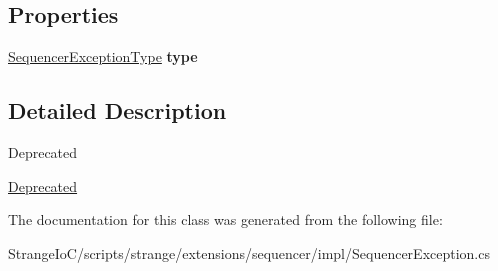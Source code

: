 \subsection*{Properties}
\begin{DoxyCompactItemize}
\item 
\hypertarget{classstrange_1_1extensions_1_1sequencer_1_1impl_1_1_sequencer_exception_a24f94543675745431c8e26addbf6cd4d}{\hyperlink{namespacestrange_1_1extensions_1_1sequencer_1_1api_aeddaacdea22f90d94ab298d24cbce41b}{Sequencer\-Exception\-Type} {\bfseries type}}\label{classstrange_1_1extensions_1_1sequencer_1_1impl_1_1_sequencer_exception_a24f94543675745431c8e26addbf6cd4d}

\end{DoxyCompactItemize}


\subsection{Detailed Description}
\begin{DoxyRefDesc}{Deprecated}
\item[\hyperlink{deprecated__deprecated000009}{Deprecated}]\end{DoxyRefDesc}


The documentation for this class was generated from the following file\-:\begin{DoxyCompactItemize}
\item 
Strange\-Io\-C/scripts/strange/extensions/sequencer/impl/Sequencer\-Exception.\-cs\end{DoxyCompactItemize}
